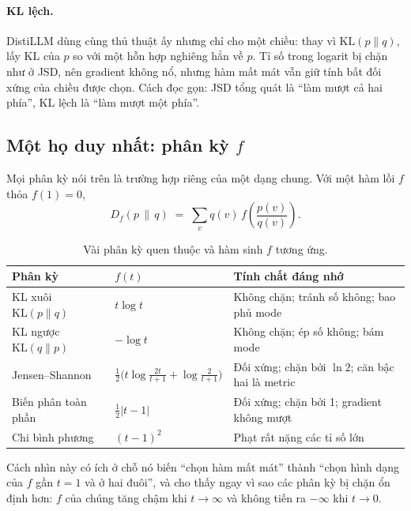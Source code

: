 \paragraph{KL lệch.} DistiLLM \cite{ko2024distillm} dùng cùng thủ thuật ấy nhưng chỉ cho một chiều: thay vì $\mathrm{KL}(p\|q)$, lấy $\mathrm{KL}$ của $p$ so với một hỗn hợp nghiêng hẳn về $p$. Tỉ số trong logarit bị chặn như ở JSD, nên gradient không nổ, nhưng hàm mất mát vẫn giữ tính bất đối xứng của chiều được chọn. Cách đọc gọn: JSD tổng quát là ``làm mượt cả hai phía'', KL lệch là ``làm mượt một phía''.

\subsection{Một họ duy nhất: phân kỳ \texorpdfstring{$f$}{f}}
\label{ssec:f_divergence}

Mọi phân kỳ nói trên là trường hợp riêng của một dạng chung. Với một hàm lồi $f$ thỏa $f(1) = 0$,
\[
D_f(p \,\|\, q) \;=\; \sum_v q(v)\, f\!\left(\frac{p(v)}{q(v)}\right).
\]

\begin{table}[H]
\centering\small
\caption{Vài phân kỳ quen thuộc và hàm sinh $f$ tương ứng.}
\label{tab:f_divergences}
\begin{tabularx}{\textwidth}{@{}>{\raggedright\arraybackslash}p{4.4cm}lX@{}}
\toprule
\textbf{Phân kỳ} & \textbf{$f(t)$} & \textbf{Tính chất đáng nhớ} \\
\midrule
KL xuôi $\mathrm{KL}(p\|q)$ & $t\log t$ & Không chặn; tránh số không; bao phủ mode \\
\addlinespace
KL ngược $\mathrm{KL}(q\|p)$ & $-\log t$ & Không chặn; ép số không; bám mode \\
\addlinespace
Jensen--Shannon & $\frac{1}{2}\Big(t\log\frac{2t}{t+1} + \log\frac{2}{t+1}\Big)$ & Đối xứng; chặn bởi $\ln 2$; căn bậc hai là metric \\
\addlinespace
Biến phân toàn phần & $\tfrac12\lvert t - 1\rvert$ & Đối xứng; chặn bởi 1; gradient không mượt \\
\addlinespace
Chi bình phương & $(t-1)^2$ & Phạt rất nặng các tỉ số lớn \\
\bottomrule
\end{tabularx}
\end{table}

Cách nhìn này có ích ở chỗ nó biến ``chọn hàm mất mát'' thành ``chọn hình dạng của $f$ gần $t = 1$ và ở hai đuôi'', và cho thấy ngay vì sao các phân kỳ bị chặn ổn định hơn: $f$ của chúng tăng chậm khi $t \to \infty$ và không tiến ra $-\infty$ khi $t \to 0$.

